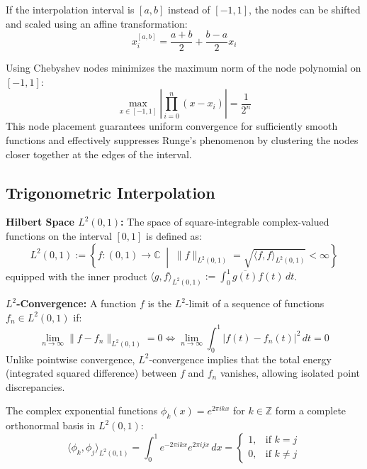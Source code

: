 \begin{remark}
    If the interpolation interval is $[a, b]$ instead of $[-1, 1]$, the nodes can be shifted and scaled using an affine transformation:
    $$x_i^{[a,b]} = \frac{a+b}{2} + \frac{b-a}{2} x_i$$
\end{remark}

\begin{theorem}
    Using Chebyshev nodes minimizes the maximum norm of the node polynomial on $[-1, 1]$:
    $$\max_{x \in [-1, 1]} \left| \prod_{i=0}^{n} (x - x_i) \right| = \frac{1}{2^n}$$
    This node placement guarantees uniform convergence for sufficiently smooth functions and effectively suppresses Runge's phenomenon by clustering the nodes closer together at the edges of the interval.
\end{theorem}

\subsection{Trigonometric Interpolation}

\begin{definition}
    \textbf{Hilbert Space $L^2(0,1)$:} The space of square-integrable complex-valued functions on the interval $[0,1]$ is defined as:
    $$L^2(0,1) := \left\{ f: (0,1) \rightarrow \mathbb{C} \;\middle|\; \|f\|_{L^2(0,1)} = \sqrt{\langle f, f \rangle_{L^2(0,1)}} < \infty \right\}$$
    equipped with the inner product $\langle g, f \rangle_{L^2(0,1)} := \int_0^1 \overline{g(t)} f(t) \, dt$.
\end{definition}

\begin{remark}
    \textbf{$L^2$-Convergence:} A function $f$ is the $L^2$-limit of a sequence of functions $f_n \in L^2(0,1)$ if:
    $$\lim_{n \rightarrow \infty} \|f - f_n\|_{L^2(0,1)} = 0 \iff \lim_{n \rightarrow \infty} \int_0^1 |f(t) - f_n(t)|^2 \, dt = 0$$
    Unlike pointwise convergence, $L^2$-convergence implies that the total energy (integrated squared difference) between $f$ and $f_n$ vanishes, allowing isolated point discrepancies.
\end{remark}

\begin{theorem}
    The complex exponential functions $\phi_k(x) = e^{2\pi i k x}$ for $k \in \mathbb{Z}$ form a complete orthonormal basis in $L^2(0,1)$:
    $$\langle \phi_k, \phi_j \rangle_{L^2(0,1)} = \int_0^1 e^{-2\pi i k x} e^{2\pi i j x} \, dx = \begin{cases} 1, & \text{if } k = j \\ 0, & \text{if } k \neq j \end{cases}$$
\end{theorem}

